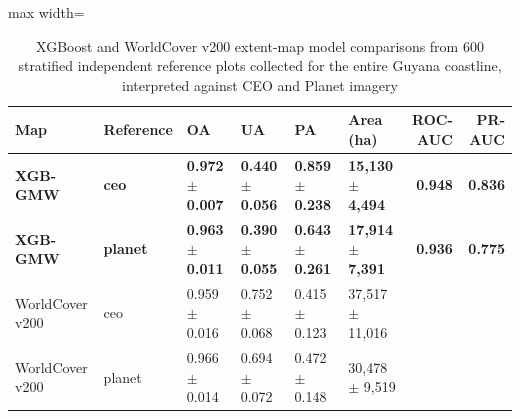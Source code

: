 \begin{table}[htbp]
\centering
\caption{XGBoost and WorldCover v200 extent-map model comparisons from 600 stratified independent reference plots collected for the entire Guyana coastline, interpreted against CEO and Planet imagery}
\label{tab:coastwide-results}
\begin{adjustbox}{max width=\textwidth}
\begin{tabular}{llllllrr}
\toprule
Map & Reference & OA & UA & PA & Area (ha) & ROC-AUC & PR-AUC \\
\midrule
\textbf{XGB-GMW} & \textbf{ceo} & \textbf{0.972 $\pm$ 0.007} & \textbf{0.440 $\pm$ 0.056} & \textbf{0.859 $\pm$ 0.238} & \textbf{15,130 $\pm$ 4,494} & \textbf{0.948} & \textbf{0.836} \\
\textbf{XGB-GMW} & \textbf{planet} & \textbf{0.963 $\pm$ 0.011} & \textbf{0.390 $\pm$ 0.055} & \textbf{0.643 $\pm$ 0.261} & \textbf{17,914 $\pm$ 7,391} & \textbf{0.936} & \textbf{0.775} \\
WorldCover v200 & ceo & 0.959 $\pm$ 0.016 & 0.752 $\pm$ 0.068 & 0.415 $\pm$ 0.123 & 37,517 $\pm$ 11,016 &  &  \\
WorldCover v200 & planet & 0.966 $\pm$ 0.014 & 0.694 $\pm$ 0.072 & 0.472 $\pm$ 0.148 & 30,478 $\pm$ 9,519 &  &  \\
\bottomrule
\end{tabular}
\end{adjustbox}
\end{table}
